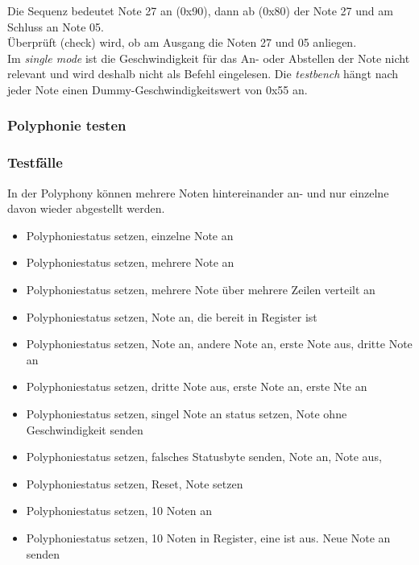 Die Sequenz bedeutet Note 27 an (0x90), dann ab (0x80) der Note 27 und am Schluss an Note 05. \\
Überprüft (check) wird, ob am Ausgang die Noten 27 und 05 anliegen.\\
Im \textit{single mode} ist die Geschwindigkeit für das An- oder Abstellen der Note nicht relevant und wird deshalb nicht als Befehl eingelesen. Die \textit{testbench} hängt nach jeder Note einen Dummy-Geschwindigkeitswert von 0x55 an. \bigskip


\subsubsection{Polyphonie testen }

\subsubsection{Testfälle}
In der Polyphony können mehrere Noten hintereinander an- und nur einzelne davon wieder abgestellt werden. \\
\begin{itemize}
\item Polyphoniestatus setzen, einzelne Note an
\item Polyphoniestatus setzen, mehrere Note an
\item Polyphoniestatus setzen, mehrere Note über mehrere Zeilen verteilt an
\item Polyphoniestatus setzen, Note an, die bereit in Register ist
\item Polyphoniestatus setzen, Note an, andere Note an, erste Note aus, dritte Note an
\item Polyphoniestatus setzen, dritte Note aus, erste Note an, erste Nte an
\item Polyphoniestatus setzen, singel Note an status setzen, Note ohne Geschwindigkeit senden
\item Polyphoniestatus setzen, falsches Statusbyte senden, Note an, Note aus,
\item Polyphoniestatus setzen, Reset, Note setzen
\item Polyphoniestatus setzen, 10 Noten an
\item Polyphoniestatus setzen, 10 Noten in Register, eine ist aus. Neue Note an senden
\end{itemize}
\smallskip

